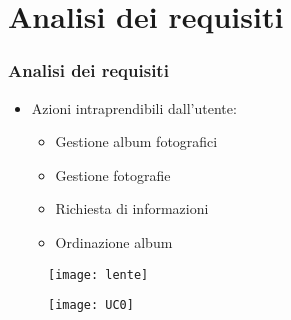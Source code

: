 
\section{Analisi dei requisiti}
\begin{frame}

  \frametitle{Analisi dei requisiti}

  \begin{itemize}
  \item Azioni intraprendibili dall'utente:
    \begin{itemize}
    \item Gestione album fotografici
    \item Gestione fotografie
    \item Richiesta di informazioni
    \item Ordinazione album
    \end{itemize}
  \end{itemize}

  \begin{figure}[H]
    \centering
    \texttt{[image: lente]}
  \end{figure}
\end{frame}

\begin{frame}
  
  \begin{figure}[H]
    \centering
    \texttt{[image: UC0]}
  \end{figure}
\end{frame}
